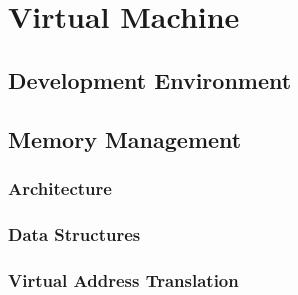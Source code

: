 
\chapter{Virtual Machine}

\section{Development Environment}

\section{Memory Management}
\subsection{Architecture}
\subsection{Data Structures}
\subsection{Virtual Address Translation}
